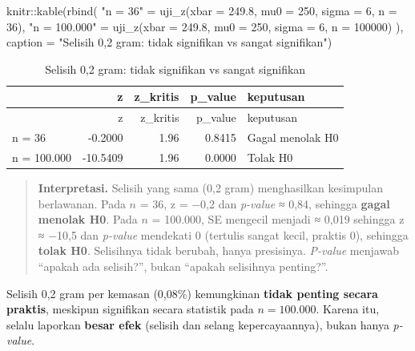 \documentclass[
  indonesian,
  letterpaper,
]{book}
\newenvironment{Shaded}{\begin{snugshade}}{\end{snugshade}}
\newcommand{\AttributeTok}[1]{\textcolor[rgb]{0.40,0.45,0.13}{#1}}
\newcommand{\DecValTok}[1]{\textcolor[rgb]{0.68,0.00,0.00}{#1}}
\newcommand{\FloatTok}[1]{\textcolor[rgb]{0.68,0.00,0.00}{#1}}
\newcommand{\FunctionTok}[1]{\textcolor[rgb]{0.28,0.35,0.67}{#1}}
\newcommand{\NormalTok}[1]{\textcolor[rgb]{0.00,0.23,0.31}{#1}}
\newcommand{\OtherTok}[1]{\textcolor[rgb]{0.00,0.23,0.31}{#1}}
\newcommand{\SpecialCharTok}[1]{\textcolor[rgb]{0.37,0.37,0.37}{#1}}
\newcommand{\StringTok}[1]{\textcolor[rgb]{0.13,0.47,0.30}{#1}}
\begin{document}
\begin{Shaded}
\begin{Highlighting}[]
\NormalTok{knitr}\SpecialCharTok{::}\FunctionTok{kable}\NormalTok{(}\FunctionTok{rbind}\NormalTok{(}
  \StringTok{"n = 36"}      \OtherTok{=} \FunctionTok{uji\_z}\NormalTok{(}\AttributeTok{xbar =} \FloatTok{249.8}\NormalTok{, }\AttributeTok{mu0 =} \DecValTok{250}\NormalTok{, }\AttributeTok{sigma =} \DecValTok{6}\NormalTok{, }\AttributeTok{n =} \DecValTok{36}\NormalTok{),}
  \StringTok{"n = 100.000"} \OtherTok{=} \FunctionTok{uji\_z}\NormalTok{(}\AttributeTok{xbar =} \FloatTok{249.8}\NormalTok{, }\AttributeTok{mu0 =} \DecValTok{250}\NormalTok{, }\AttributeTok{sigma =} \DecValTok{6}\NormalTok{, }\AttributeTok{n =} \DecValTok{100000}\NormalTok{)}
\NormalTok{), }\AttributeTok{caption =} \StringTok{"Selisih 0,2 gram: tidak signifikan vs sangat signifikan"}\NormalTok{)}
\end{Highlighting}
\end{Shaded}

\begin{longtable}[]{@{}lrrrl@{}}
\caption{Selisih 0,2 gram: tidak signifikan vs sangat
signifikan}\tabularnewline
\toprule\noalign{}
& z & z\_kritis & p\_value & keputusan \\
\midrule\noalign{}
\endfirsthead
\toprule\noalign{}
& z & z\_kritis & p\_value & keputusan \\
\midrule\noalign{}
\endhead
\bottomrule\noalign{}
\endlastfoot
n = 36 & -0.2000 & 1.96 & 0.8415 & Gagal menolak H0 \\
n = 100.000 & -10.5409 & 1.96 & 0.0000 & Tolak H0 \\
\end{longtable}

\begin{quote}
\textbf{Interpretasi.} Selisih yang sama (0,2 gram) menghasilkan
kesimpulan berlawanan. Pada \(n\) = 36, z = −0,2 dan \emph{p-value} ≈
0,84, sehingga \textbf{gagal menolak H0}. Pada \(n\) = 100.000, SE
mengecil menjadi ≈ 0,019 sehingga z ≈ −10,5 dan \emph{p-value} mendekati
0 (tertulis sangat kecil, praktis 0), sehingga \textbf{tolak H0}.
Selisihnya tidak berubah, hanya presisinya. \emph{P-value} menjawab
``apakah ada selisih?'', bukan ``apakah selisihnya penting?''.
\end{quote}

Selisih 0,2 gram per kemasan (0,08\%) kemungkinan \textbf{tidak penting
secara praktis}, meskipun signifikan secara statistik pada
\(n = 100.000\). Karena itu, selalu laporkan \textbf{besar efek}
(selisih dan selang kepercayaannya), bukan hanya \emph{p-value}.
\end{document}
